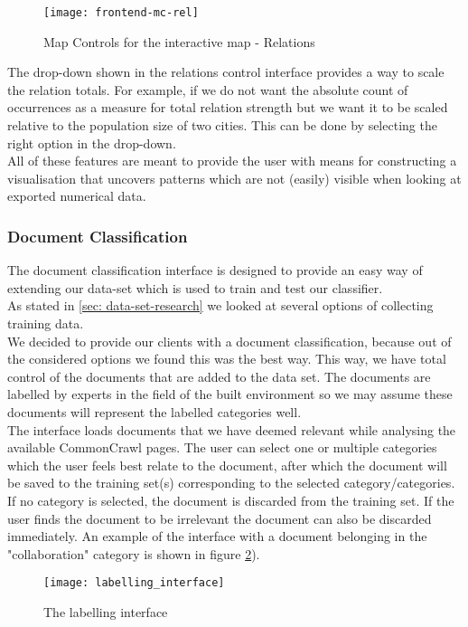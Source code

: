 \begin{figure}[H]
\centering
\texttt{[image: frontend-mc-rel]}
\caption{Map Controls for the interactive map - Relations}
\label{fig:frontend-mc-rel}
\end{figure}

The drop-down shown in the relations control interface provides a way to scale the relation totals. For example, if we do not want the absolute count of occurrences as a measure for total relation strength but we want it to be scaled relative to the population size of two cities. This can be done by selecting the right option in the drop-down.\\
All of these features are meant to provide the user with means for constructing a visualisation that uncovers patterns which are not (easily) visible when looking at exported numerical data.

\subsubsection{Document Classification}
The document classification interface is designed to provide an easy way of extending our data-set which is used to train and test our classifier.\\
As stated in \ref{sec: data-set-research} we looked at several options of collecting training data.\\
We decided to provide our clients with a document classification, because out of the considered options we found this was the best way. This way, we have total control of the documents that are added to the data set. The documents are labelled by experts in the field of the built environment so we may assume these documents will represent the labelled categories well. \\
The interface loads documents that we have deemed relevant while analysing the available CommonCrawl pages. The user can select one or multiple categories which the user feels best relate to the document, after which the document will be saved to the training set(s) corresponding to the selected category/categories. If no category is selected, the document is discarded from the training set. If the user finds the document to be irrelevant the document can also be discarded immediately. An example of the interface with a document belonging in the "collaboration" category is shown in figure \ref{fig:frontend-label}).
\begin{figure}[H]
\centering
\texttt{[image: labelling\_interface]}
\caption{The labelling interface}
\label{fig:frontend-label}
\end{figure}

